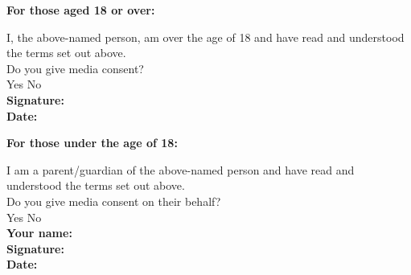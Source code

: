 \documentclass[a4paper,10pt]{article}
\newcommand{\checkbox}[1]{#1\hspace{0.2cm}\raisebox{-0.3mm}{$\square$}}
\newcommand{\textfield}[1]{\textbf{#1:} \hrulefill\hspace{0mm}}
\newcommand{\fieldsep}{\\[2.5mm]}
\begin{document}
\begin{minipage}[t]{0.48\textwidth}
\textbf{For those aged 18 or over:}

I, the above-named person, am over the age of 18 and have read and understood the terms set out above.\\

Do you give media consent? \\[2mm]
\checkbox{Yes} \hspace{1cm} \checkbox{No}\\

\textfield{Signature} \fieldsep
\textfield{Date}
\end{minipage}
\hspace{0.02\textwidth}
\begin{minipage}[t]{0.48\textwidth}
\textbf{For those under the age of 18:}

I am a parent/guardian of the above-named person and have read and understood the terms set out above.\\

Do you give media consent on their behalf?\\[2mm]
\checkbox{Yes} \hspace{1cm} \checkbox{No}\\

\textfield{Your name} \fieldsep
\textfield{Signature} \fieldsep
\textfield{Date}
\end{minipage}
\end{document}
